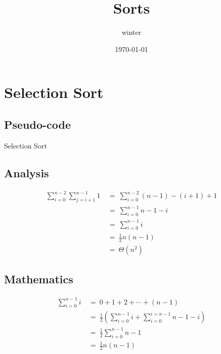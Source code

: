 \documentclass{article}
\title{\heiti Sorts}
\author{winter}
\date{\today}
\begin{document}
\section{Selection Sort}
\subsection{Pseudo-code}

\begin{algorithm}
  \caption{Selection Sort}
  \DontPrintSemicolon

\end{algorithm}

\subsection{Analysis}

\begin{equation*}
    \begin{split}
        \sum_{i=0}^{n-2}\sum_{j=i+1}^{n-1} 1  \ 
        &=\  \sum_{i=0}^{n-2} {(n-1)-(i+1) + 1} \\
        &=\  \sum_{i=0}^{n-1} {n-1-i} \\
        &=\  \sum_{i=0}^{n-1} i \\
        &=\  \frac{1}{2}n(n-1) \\
        &=\  \Theta(n^2)
    \end{split}
\end{equation*}

\subsection{Mathematics}
    \begin{equation*}
        \begin{split}
            \sum_{i=0}^{n-1} i\ 
            &=\  0 + 1 + 2 + \cdots + (n-1)\\
            &=\  \frac{1}{2} (\sum_{i=0}^{n-1} i  + \sum_{i=0}^{i=n-1} n-1-i) \\
            &=\  \frac{1}{2} \sum_{i=0}^{n-1} n-1\\
            &=\  \frac{1}{2} n(n-1)
        \end{split}
    \end{equation*}
\end{document}
